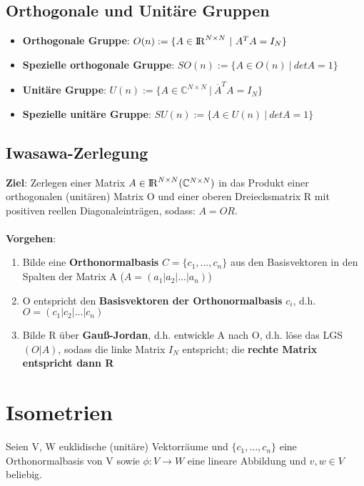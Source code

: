 \documentclass[10pt,a4paper]{article}
\def\realnumbers{{\rm I\!R}}
\def\complexnumbers{{\mathbb{C}}}
\begin{document}
	\subsection{Orthogonale und Unitäre Gruppen}
	\begin{itemize}
		\item \textbf{Orthogonale Gruppe}: $O(n) := \{A \in \realnumbers^{N\times N}\ |\ A^TA = I_N\}$
		\item \textbf{Spezielle orthogonale Gruppe}: $SO(n) := \{A \in O(n)\ |\ det A = 1\}$
		\item \textbf{Unitäre Gruppe}: $U(n) := \{A \in \complexnumbers^{N\times N}\ |\ \overline{A}^TA = I_N\}$
		\item \textbf{Spezielle unitäre Gruppe}: $SU(n) := \{A \in U(n)\ |\ det A = 1\}$
	\end{itemize}

	\subsection{Iwasawa-Zerlegung}
	\textbf{Ziel}: Zerlegen einer Matrix $A \in \realnumbers^{N\times N} (\complexnumbers^{N\times N})$ in das Produkt einer orthogonalen (unitären) Matrix O und einer oberen Dreiecksmatrix R mit positiven reellen Diagonaleinträgen, sodass: $A = OR$.\\\\
	\textbf{Vorgehen}:
	\begin{enumerate}
		\item Bilde eine \textbf{Orthonormalbasis} $C = \{c_1, ..., c_n\}$ aus den Basisvektoren in den Spalten der Matrix A ($A = (a_1 | a_2 | ... | a_n)$)
		\item O entspricht den \textbf{Basisvektoren der Orthonormalbasis} $c_i$, d.h. $O = (c_1 | c_2 | ... | c_n)$
		\item Bilde R über \textbf{Gauß-Jordan}, d.h. entwickle A nach O, d.h. löse das LGS $(O | A)$, sodass die linke Matrix $I_N$ entspricht; die \textbf{rechte Matrix entspricht dann R}
	\end{enumerate}
	\section{Isometrien}
	Seien V, W euklidische (unitäre) Vektorräume und $\{c_1, ..., c_n\}$ eine Orthonormalbasis von V sowie $\phi: V \rightarrow W$ eine lineare Abbildung und $v, w \in V$ beliebig.
	
\end{document}
